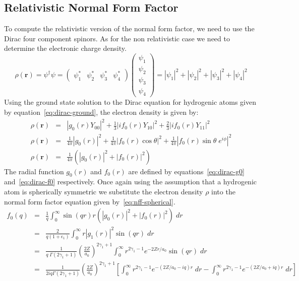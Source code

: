 \documentclass[a4paper,titlepage]{report}
\newcommand{\mb}[1]{\mathbf{#1}}
\begin{document}
	\subsection{Relativistic Normal Form Factor}
	To compute the relativistic version of the normal form factor, we
	need to use the Dirac four component spinors. As for the non
	relativistic case we need to determine the electronic charge
	density.
	\begin{equation*}
		\rho(\mb{r}) = \psi^{\dagger} \psi =
			\left(
				\begin{array}{cccc}
					\psi_1^* & \psi_2^* & \psi_3^* & \psi_4^*	
				\end{array}
			\right)
			\left(
				\begin{array}{c}
					\psi_1 \\
					\psi_2 \\
					\psi_3 \\
					\psi_4
				\end{array}
			\right)
			= |\psi_1|^2 + |\psi_2|^2 + |\psi_3|^2 + |\psi_4|^2
	\end{equation*}
	Using the ground state solution to the Dirac equation for hydrogenic
	atoms given by equation~\ref{eq:dirac-ground}, the electron density
	is given by:
	\begin{eqnarray*}
		\rho(\mb{r}) & = & 	|g_0(r) Y_{00}|^2 + 
							\frac{1}{3} |i f_0(r) Y_{10}|^2 +
							\frac{2}{3} |i f_0(r) Y_{11}|^2
		\\
		\rho(\mb{r}) & = & 	\frac{1}{4\pi} |g_0(r)|^2 +
							\frac{1}{4\pi} |f_0(r) \cos \theta|^2  +
							\frac{1}{4\pi} |f_0(r) \sin \theta \; e^{i\phi}|^2 
		\\
		\rho(\mb{r}) & = & 	\frac{1}{4\pi} 
							\left(
								|g_0(r)|^2 + |f_0(r)|^2
							\right)
	\end{eqnarray*}
	The radial function $g_0(r)$ and $f_0(r)$ are defined by
	equations~\ref{eq:dirac-g0} and~\ref{eq:dirac-f0} respectively. Once again
	using the assumption that a hydrogenic atom is spherically symmetric we
	substitute the electron density $\rho$ into the normal form factor equation
	given by~\ref{eq:nff-spherical}.
	\begin{eqnarray*}
		f_0(q) &=& 	\frac{1}{q} 
					\int_0^\infty \sin (qr) r 
					\left(
						|g_0(r)|^2 + |f_0(r)|^2
					\right) \; dr
		\\
			    &=&	\frac{2}{q(1 + \epsilon_1)} 
					\int_0^\infty r |g_1(r)|^2 \sin (qr) \; dr
		\\
				&=& \frac{1}{q \; \Gamma(2\gamma_1 + 1)}
					\left(
						\frac{2Z}{a_0}	
					\right)^{2\gamma_1 + 1}
					\int_0^\infty r^{2\gamma_1 - 1} e^{-2Zr/a_0} \sin (qr) \; dr
		\\
				&=& \frac{1}{2iq \Gamma(2\gamma_1 + 1)}
					\left(
						\frac{2Z}{a_0}
					\right)^{2\gamma_1 + 1}
					\left[
						\int_0^\infty r^{2\gamma_1-1} e^{-(2Z/a_0 - iq)r} \; dr
					-
						\int_0^\infty r^{2\gamma_1-1} e^{-(2Z/a_0 + iq)r} \; dr
					\right]
	\end{eqnarray*}
\end{document}

